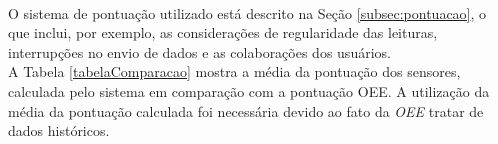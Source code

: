 \begin{center}
\label{tabelaOEE}
\end{center}

\\\null \quad O sistema de pontuação utilizado está descrito na Seção \ref{subsec:pontuacao}, o que inclui, por exemplo, as considerações de regularidade das leituras, interrupções no envio de dados e as colaborações dos usuários.
\\\null \quad A Tabela \ref{tabelaComparacao} mostra a média da pontuação dos sensores, calculada pelo sistema em comparação com a pontuação \acrshort{OEE}. A utilização da média da pontuação calculada foi necessária devido ao fato da \textit{\acrlong{OEE}} tratar de dados históricos.

